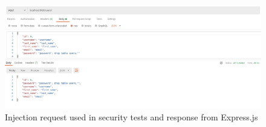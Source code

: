 \begin{figure}[H]
    \includegraphics[width=\columnwidth]{figures/pictures/injectionRequest.jpg}
    \caption{Injection request used in security tests and response from Express.js}
    \label{fig:injectionRequest}
\end{figure}
